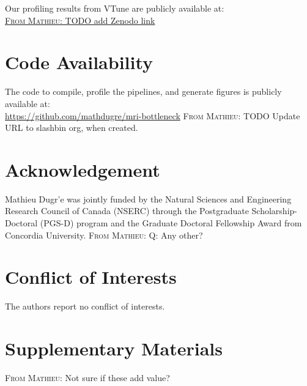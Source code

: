 \documentclass[conference]{IEEEtran}
\newcommand{\MD}[1]{\color{magenta}\textsc{From Mathieu: }#1\color{black}}
\begin{document}
Our profiling results from VTune are publicly available at:
\\\href{URL}{\MD{TODO add Zenodo link}}
	
\section{Code Availability}
\label{sec:code-availability}
The code to compile, profile the pipelines, and generate figures is publicly available at:
\\\href{https://github.com/mathdugre/mri-bottleneck}{https://github.com/mathdugre/mri-bottleneck}
\MD{TODO Update URL to slashbin org, when created.}
													
\section*{Acknowledgement}
Mathieu Dugr'e was jointly funded by the Natural Sciences and Engineering Research Council of Canada (NSERC) through the Postgraduate Scholarship-Doctoral (PGS-D) program and the Graduate Doctoral Fellowship Award from Concordia University.
\MD{Q: Any other?}
													
\section*{Conflict of Interests}
The authors report no conflict of interests.
													

% 

													
\newpage
\onecolumn
\section*{Supplementary Materials}
\MD{Not sure if these add value?}
\label{sec:supplementary}
\end{document}
